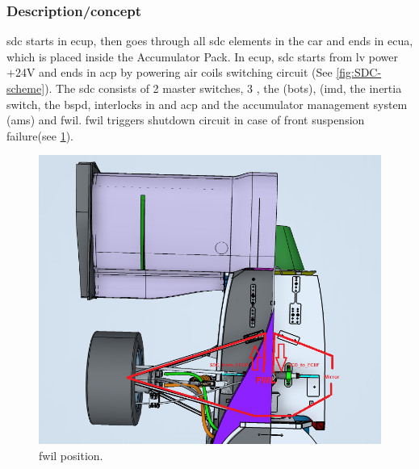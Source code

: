 
\subsubsection{Description/concept}

\Acrfull{sdc} starts in \gls{ecup}, then goes through all \gls{sdc} elements in the car and ends in \gls{ecua}, which is placed inside the Accumulator Pack. In \gls{ecup}, \gls{sdc} starts from \gls{lv} power +24V and ends in \gls{acp} by powering \gls{air} coils switching circuit (See \ref{fig:SDC-scheme}). The \gls{sdc} consists of 2 master switches, 3 , the (\acrfull{bots}), (\acrfull{imd}, the inertia switch, the \acrfull{bspd}, interlocks in  and \acrfull{acp} and the accumulator management system (\gls{ams}) and \gls{fwil}. \gls{fwil} triggers shutdown circuit in case of front suspension failure(see \ref{fig:fwil_scheme}). 

\begin{figure}[H]
	\includegraphics[width=\textwidth]{./img/fwil.png}
	\caption{\gls{fwil} position.}
	\label{fig:fwil_scheme}
\end{figure}

